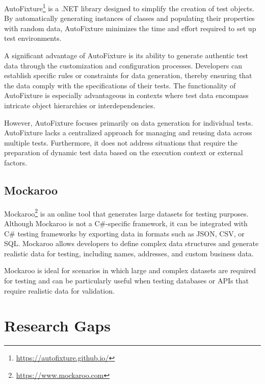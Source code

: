 AutoFixture\footnote{\href{https://autofixture.github.io/}{https://autofixture.github.io/}} is a .NET library designed to simplify the creation of test objects. By automatically generating instances of classes and populating their properties with random data, AutoFixture minimizes the time and effort required to set up test environments.

A significant advantage of AutoFixture is its ability to generate authentic test data through the customization and configuration processes. Developers can establish specific rules or constraints for data generation, thereby ensuring that the data comply with the specifications of their tests. The functionality of AutoFixture is especially advantageous in contexts where test data encompass intricate object hierarchies or interdependencies.

However, AutoFixture focuses primarily on data generation for individual tests. AutoFixture lacks a centralized approach for managing and reusing data across multiple tests. Furthermore, it does not address situations that require the preparation of dynamic test data based on the execution context or external factors.

\subsection{Mockaroo}

Mockaroo\footnote{\href{https://www.mockaroo.com}{https://www.mockaroo.com}} is an online tool that generates large datasets for testing purposes. Although Mockaroo is not a C\#-specific framework, it can be integrated with C\# testing frameworks by exporting data in formats such as JSON, CSV, or SQL. Mockaroo allows developers to define complex data structures and generate realistic data for testing, including names, addresses, and custom business data.

Mockaroo is ideal for scenarios in which large and complex datasets are required for testing and can be particularly useful when testing databases or APIs that require realistic data for validation.


\section{Research Gaps}
\todo{}